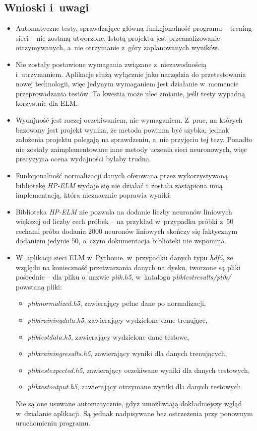\documentclass{article}
\begin{document}
\subsection{Wnioski i~uwagi}
\begin{itemize}
\item Automatyczne testy, sprawdzające główną funkcjonalność programu -- trening sieci -- nie zostaną utworzone. Istotą projektu jest przeanalizowanie otrzymywanych, a~nie otrzymanie z~góry zaplanowanych wyników.
\item Nie zostały postawione wymagania związane z~niezawodnością i~utrzymaniem. Aplikacje służą wyłącznie jako narzędzia do przetestowania nowej technologii, więc jedynym wymaganiem jest działanie w~momencie przeprowadzania testów. Ta kwestia może ulec zmianie, jeśli testy wypadną korzystnie dla ELM.
\item Wydajność jest raczej oczekiwaniem, nie wymaganiem. Z~prac, na których bazowany jest projekt wynika, że metoda powinna być szybka, jednak założenia projektu polegają na sprawdzeniu, a~nie przyjęciu tej tezy. Ponadto nie zostały zaimplementowane inne metody uczenia sieci neuronowych, więc precyzyjna ocena wydajności byłaby trudna.
\item Funkcjonalność normalizacji danych oferowana przez wykorzystywaną bibliotekę \textit{HP-ELM} wydaje się nie działać i~została zastąpiona inną implementacją, która nieznacznie poprawia wyniki.
\item Biblioteka \textit{HP-ELM} nie pozwala na dodanie liczby neuronów liniowych większej od liczby cech próbek -- na przykład w~przypadku próbki z~50 cechami próba dodania 2000 neuronów liniowych skończy się faktycznym dodaniem jedynie 50, o~czym dokumentacja biblioteki nie wspomina.
\item W~aplikacji sieci ELM w~Pythonie, w~przypadku danych typu \textit{hdf5}, ze względu na konieczność przetwarzania danych na dysku, tworzone są pliki pośrednie -- dla pliku o~nazwie \textit{plik.h5}, w~katalogu \textit{plik\textunderscore test\textunderscore results/plik/} powstaną pliki:
\begin{itemize}
\item \textit{plik\textunderscore normalized.h5}, zawierający pełne dane po normalizacji, 
\item \textit{plik\textunderscore training\textunderscore data.h5}, zawierający wydzielone dane trenujące, 
\item \textit{plik\textunderscore test\textunderscore data.h5}, zawierający wydzielone dane testowe,
\item \textit{plik\textunderscore training\textunderscore results.h5}, zawierający wyniki dla danych trenujących,
\item \textit{plik\textunderscore test\textunderscore expected.h5}, zawierający oczekiwane wyniki dla danych testowych,
\item \textit{plik\textunderscore test\textunderscore output.h5}, zawierający otrzymane wyniki dla danych testowych.
\end{itemize} 
Nie są one usuwane automatycznie, gdyż umożliwiają dokładniejszy wgląd w~działanie aplikacji. Są jednak nadpisywane bez ostrzeżenia przy ponownym uruchomieniu programu.
\end{itemize}
\clearpage
\end{document}
